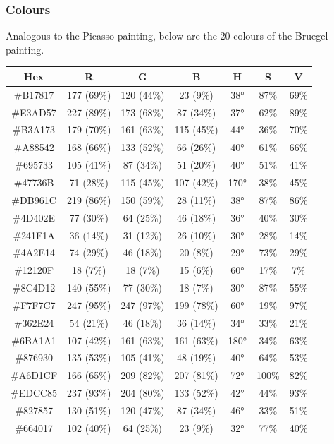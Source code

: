 \documentclass[12pt]{article}
\begin{document}
\subsubsection{Colours}

Analogous to the Picasso painting, below are the 20 colours of the Bruegel painting.

\begin{tabular}{| c | c | c | c | c | c | c |}
\hline
Hex & R & G & B & H & S & V \\
\hline
\#B17817 & 177 (69\%) & 120 (44\%) & 23 (9\%) & 38° & 87\% & 69\% \\ 
\hline
\#E3AD57 & 227 (89\%) & 173 (68\%) & 87 (34\%) & 37° & 62\% & 89\% \\ 
\hline
\#B3A173 & 179 (70\%) & 161 (63\%) & 115 (45\%) & 44° & 36\% & 70\% \\ 
\hline
\#A88542 & 168 (66\%) & 133 (52\%) & 66 (26\%) & 40° & 61\% & 66\% \\ 
\hline
\#695733 & 105 (41\%) & 87 (34\%) & 51 (20\%) & 40° & 51\% & 41\% \\ 
\hline
\#47736B & 71 (28\%) & 115 (45\%) & 107 (42\%) & 170° & 38\% & 45\% \\ 
\hline
\#DB961C & 219 (86\%) & 150 (59\%) & 28 (11\%) & 38° & 87\% & 86\% \\ 
\hline
\#4D402E & 77 (30\%) & 64 (25\%) & 46 (18\%) & 36° & 40\% & 30\% \\ 
\hline
\#241F1A & 36 (14\%) & 31 (12\%) & 26 (10\%) & 30° & 28\% & 14\% \\ 
\hline
\#4A2E14 & 74 (29\%) & 46 (18\%) & 20 (8\%) & 29° & 73\% & 29\% \\ 
\hline
\#12120F & 18 (7\%) & 18 (7\%) & 15 (6\%) & 60° & 17\% & 7\% \\ 
\hline
\#8C4D12 & 140 (55\%) & 77 (30\%) & 18 (7\%) & 30° & 87\% & 55\% \\ 
\hline
\#F7F7C7 & 247 (95\%) & 247 (97\%) & 199 (78\%) & 60° & 19\% & 97\% \\ 
\hline
\#362E24 & 54 (21\%) & 46 (18\%) & 36 (14\%) & 34° & 33\% & 21\% \\ 
\hline
\#6BA1A1 & 107 (42\%) & 161 (63\%) & 161 (63\%) & 180° & 34\% & 63\% \\ 
\hline
\#876930 & 135 (53\%) & 105 (41\%) & 48 (19\%) & 40° & 64\% & 53\% \\ 
\hline
\#A6D1CF & 166 (65\%) & 209 (82\%) & 207 (81\%) & 72° & 100\% & 82\% \\ 
\hline
\#EDCC85 & 237 (93\%) & 204 (80\%) & 133 (52\%) & 42° & 44\% & 93\% \\ 
\hline
\#827857 & 130 (51\%) & 120 (47\%) & 87 (34\%) & 46° & 33\% & 51\% \\ 
\hline
\#664017 & 102 (40\%) & 64 (25\%) & 23 (9\%) & 32° & 77\% & 40\% \\ 
\hline
\end{tabular}
\end{document}
